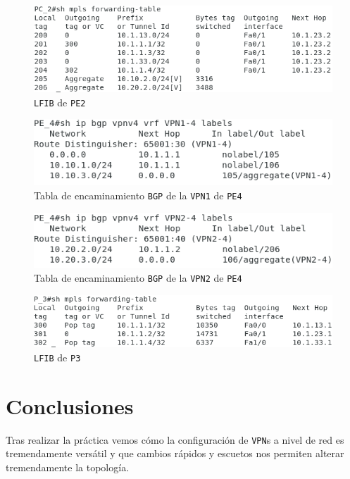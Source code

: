 \documentclass[11pt]{article}
\begin{document}
            \begin{figure}
                \centering
                \includegraphics[width=0.6\linewidth]{mpls_table_PE_2.png}
                \caption{\texttt{LFIB} de \texttt{PE2}}
                \label{fig:mpls_table_PE_2}
            \end{figure}

            \begin{figure}
                \centering
                \includegraphics[width=0.6\linewidth]{ip_bgp_VPN1_PE_4.png}
                \caption{Tabla de encaminamiento \texttt{BGP} de la \texttt{VPN1} de \texttt{PE4}}
                \label{fig:ip_bgp_VPN1_PE_4}
            \end{figure}

            \begin{figure}
                \centering
                \includegraphics[width=0.6\linewidth]{ip_bgp_VPN2_PE_4.png}
                \caption{Tabla de encaminamiento \texttt{BGP} de la \texttt{VPN2} de \texttt{PE4}}
                \label{fig:ip_bgp_VPN2_PE_4}
            \end{figure}

            \begin{figure}
                \centering
                \includegraphics[width=0.6\linewidth]{mpls_table_P_3.png}
                \caption{\texttt{LFIB} de \texttt{P3}}
                \label{fig:mpls_table_P_3}
            \end{figure}

    \section{Conclusiones}
            Tras realizar la práctica vemos cómo la configuración de \texttt{VPN}s a nivel de red es tremendamente versátil y que cambios rápidos y escuetos nos permiten alterar tremendamente la topología.
\end{document}
